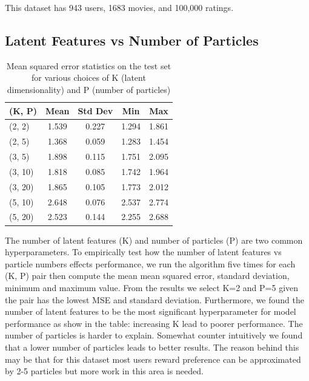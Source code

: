 \documentclass{article}
\begin{document}
This dataset has 943 users, 1683 movies, and 100,000 ratings.
\subsection{Latent Features vs Number of Particles}

\begin{table}[ht]
\caption{Mean squared error statistics on the test set for various choices of K
(latent dimensionality) and P (number of particles)}
\label{sample-table}
\vskip 0.15in
\begin{center}
\begin{small}
\begin{sc}
\begin{tabular}{lcccc}
\toprule
(K, P) & Mean & Std Dev & Min & Max \\
\midrule
(2, 2)  & 1.539 & 0.227 & 1.294 & 1.861 \\
(2, 5)  & 1.368 & 0.059 & 1.283 & 1.454 \\
(3, 5)  & 1.898 & 0.115 & 1.751 & 2.095 \\
(3, 10) & 1.818 & 0.085 & 1.742 & 1.964 \\
(3, 20) & 1.865 & 0.105 & 1.773 & 2.012 \\
(5, 10) & 2.648 & 0.076 & 2.537 & 2.774 \\
(5, 20) & 2.523 & 0.144 & 2.255 & 2.688 \\
\bottomrule
\end{tabular}
\end{sc}
\end{small}
\end{center}
\vskip -0.1in
\end{table}

The number of latent features (K) and number of particles (P) are two common hyperparameters. To empirically test how the number of latent features vs particle numbers effects performance, we run the algorithm five times for each (K, P) pair then compute the mean mean squared error, standard deviation, minimum and maximum value. From the results we select K=2 and P=5 given the pair has the lowest MSE and standard deviation. Furthermore, we found the number of latent features to be the most significant hyperparameter for model performance as show in the table: increasing K lead to poorer performance. The number of particles is harder to explain. Somewhat counter intuitively we found that a lower number of particles leads to better results. The reason behind this may be that for this dataset most users reward preference can be approximated by 2-5 particles but more work in this area is needed.
\end{document}
